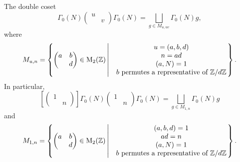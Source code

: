 \begin{proposition}\label{description of the double coset Gamma0-diag(u v)-Gamma0}
    The double coset
    \[\Gamma_0(N)\begin{pmatrix}
        u & \\ & v
    \end{pmatrix}\Gamma_0(N) = \bigsqcup_{g\in M_{u, uv}}\Gamma_0(N)g,\]
    where \[M_{u, n} = \left\{
        \begin{pmatrix}
            a & b \\ & d
        \end{pmatrix}\in \mathrm{M}_2(\mathbb{Z})\left|
        \begin{matrix}
            &u = (a, b, d)\\ 
            &n = ad\\
            &(a, N) = 1\\
            &b \text{ permutes a representative of } \mathbb{Z}/d\mathbb{Z}
        \end{matrix}
        \right.
    \right\}.\]
    In particular,\[\left[ \begin{pmatrix}
        1 & \\ & n
    \end{pmatrix} \right]\Gamma_0(N)\begin{pmatrix}
        1 & \\ & n
    \end{pmatrix}\Gamma_0(N) = \bigsqcup_{g\in M_{1, n}}\Gamma_0(N)g\]
    and \[M_{1, n} = \left\{
        \begin{pmatrix}
            a & b \\ & d
        \end{pmatrix}\in \mathrm{M}_2(\mathbb{Z})\left|
        \begin{matrix}
            &(a, b, d) = 1\\ 
            &ad = n\\
            &(a, N) = 1\\
            &b \text{ permutes a representative of } \mathbb{Z}/d\mathbb{Z}
        \end{matrix}
        \right.
    \right\}. \]
\end{proposition}

